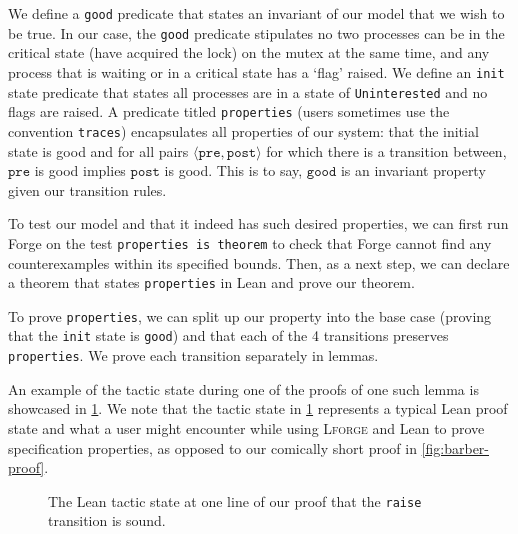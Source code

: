 We define a \texttt{good} predicate that states an invariant of our model that we wish to be true. In our case, the \texttt{good} predicate stipulates no two processes can be in the critical state (have acquired the lock) on the mutex at the same time, and any process that is waiting or in a critical state has a `flag' raised. We define an \texttt{init} state predicate that states all processes are in a state of \texttt{Uninterested} and no flags are raised. A predicate titled \texttt{properties} (users sometimes use the convention \texttt{traces}) encapsulates all properties of our system: that the initial state is good and for all pairs $\langle\texttt{pre}, \texttt{post}\rangle$ for which there is a transition between, $\texttt{pre}$ is good implies $\texttt{post}$ is good. This is to say, $\texttt{good}$ is an invariant property given our transition rules. 

To test our model and that it indeed has such desired properties, we can first run Forge on the test \texttt{properties is theorem} to check that Forge cannot find any counterexamples within its specified bounds. Then, as a next step, we can declare a theorem that states \texttt{properties} in Lean and prove our theorem. 

To prove \texttt{properties}, we can split up our property into the base case (proving that the \texttt{init} state is \texttt{good}) and that each of the 4 transitions preserves \texttt{properties}. We prove each transition separately in lemmas. 

An example of the tactic state during one of the proofs of one such lemma is showcased in \cref{fig:mutex-proof}. We note that the tactic state in \cref{fig:mutex-proof} represents a typical Lean proof state and what a user might encounter while using \textsc{Lforge} and Lean to prove specification properties, as opposed to our comically short proof in \cref{fig:barber-proof}. 

\begin{figure}[!htb]
  \centering
  \caption{The Lean tactic state at one line of our proof that the \texttt{raise} transition is sound. }
  \label{fig:mutex-proof}
\end{figure}

